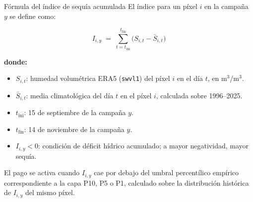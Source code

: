 \documentclass[aspectratio=169,11pt]{beamer}
\begin{document}
\begin{frame}{Fórmula del índice de sequía acumulada}
  El índice para un píxel $i$ en la campaña $y$ se define como:

  \begin{equation}
    I_{i,y} \;=\; \sum_{t=t_{\text{ini}}}^{t_{\text{fin}}}
                  \bigl(S_{i,t} - \bar{S}_{i,t}\bigr)
    \label{eq:indice}
  \end{equation}

  {\scriptsize
  \textbf{donde:}
  \begin{itemize}
    \item $S_{i,t}$: humedad volumétrica ERA5 (\texttt{swvl1}) del píxel $i$ en el día $t$, en m$^3$/m$^3$.
    \item $\bar{S}_{i,t}$: media climatológica del día $t$ en el píxel $i$, calculada sobre 1996--2025.
    \item $t_{\text{ini}}$: 15 de septiembre de la campaña $y$.
    \item $t_{\text{fin}}$: 14 de noviembre de la campaña $y$.
    \item $I_{i,y} < 0$: condición de déficit hídrico acumulado; a mayor negatividad, mayor sequía.
  \end{itemize}}

  \vspace{0.4em}
  El pago se activa cuando $I_{i,y}$ cae por debajo del umbral percentílico empírico correspondiente
  a la capa P10, P5 o P1, calculado sobre la distribución histórica de $I_{i,y}$ del mismo píxel.
\end{frame}
\end{document}
